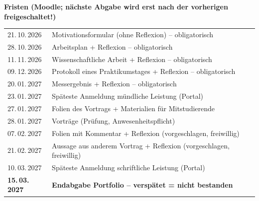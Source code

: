 
\textbf{Fristen (Moodle; nächste Abgabe wird erst nach der vorherigen freigeschaltet!)}\par\smallskip
{\small\begin{tabular}{@{}ll@{}}
21.\,10.\,2026 & Motivationsformular (ohne Reflexion) -- obligatorisch\\
28.\,10.\,2026 & Arbeitsplan + Reflexion -- obligatorisch\\
11.\,11.\,2026 & Wissenschaftliche Arbeit + Reflexion -- obligatorisch\\
09.\,12.\,2026 & Protokoll eines Praktikumstages + Reflexion -- obligatorisch\\
20.\,01.\,2027 & Messergebnis + Reflexion -- obligatorisch\\
23.\,01.\,2027 & Späteste Anmeldung mündliche Leistung (Portal)\\
27.\,01.\,2027 & Folien des Vortrags + Materialien für Mitstudierende\\
28.\,01.\,2027 & Vorträge (Prüfung, Anwesenheitspflicht)\\
07.\,02.\,2027 & Folien mit Kommentar + Reflexion (vorgeschlagen, freiwillig)\\
21.\,02.\,2027 & Aussage aus anderem Vortrag + Reflexion (vorgeschlagen, freiwillig)\\
10.\,03.\,2027 & Späteste Anmeldung schriftliche Leistung (Portal)\\
\textbf{15.\,03.\,2027} & \textbf{Endabgabe Portfolio -- verspätet = nicht bestanden}\\
\end{tabular}}\par\medskip

